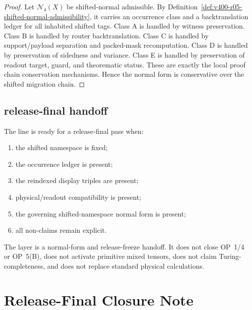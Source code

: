 \begin{proof}
Let $\mathcal N_4(X)$ be shifted-normal admissible. By
Definition~\ref{def:v400-r05-shifted-normal-admissibility}, it carries an occurrence
class and a backtranslation ledger for all inhabited shifted tags. Class A is
handled by witness preservation. Class B is handled by router backtranslation.
Class C is handled by support/payload separation and packed-mask recomputation.
Class D is handled by preservation of sidedness and variance. Class E is
handled by preservation of readout target, guard, and theorematic status.
These are exactly the local proof chain conservation mechanisms. Hence the normal form
is conservative over the shifted migration chain.
\end{proof}

\subsection{ release-final handoff}
\label{subsec:v400-r05-release-final-handoff}

\begin{definition}
\label{def:v400-r05-v400-release-final-readiness}
The  line is ready for a release-final pass when:
\begin{enumerate}[leftmargin=*]
 \item the shifted namespace is fixed;
 \item the occurrence ledger is present;
 \item the reindexed display triples are present;
 \item physical/readout compatibility is present;
 \item the governing shifted-namespace normal form is present;
 \item all non-claims remain explicit.
\end{enumerate}
\end{definition}

\begin{remark}
\label{rem:v400-r05-non-claim}
The layer is a normal-form and release-freeze handoff. It does not close
OP~1/4 or OP~5(B), does not activate primitive mixed tensors, does not claim
Turing-completeness, and does not replace standard physical calculations.
\end{remark}



\clearpage
\section{ Release-Final Closure Note}
\label{sec:v400-release-final-closure-note}

